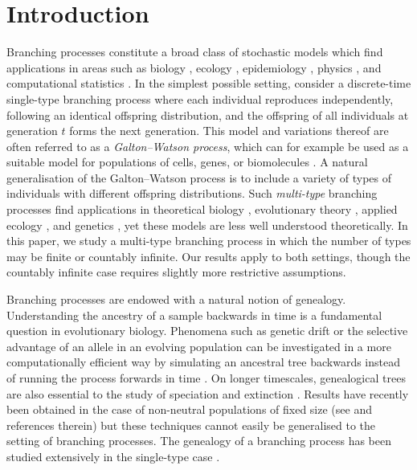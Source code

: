 \documentclass[preprint,3p,12pt]{elsarticle}
\theoremstyle{definition}
\begin{document}
\section{Introduction}
\thispagestyle{empty}
Branching processes constitute a broad class of stochastic models which find applications in areas such as biology \cite{cell_cycle, luria, colon, complexity}, ecology \cite{lambert}, epidemiology \cite{epidemiology}, physics \cite{harris1963}, and computational statistics \cite{multilevel}. 
In the simplest possible setting, consider a discrete-time single-type branching process where each individual reproduces independently, following an identical offspring distribution, and the offspring of all individuals at generation $t$ forms the next generation. This model and variations thereof are often referred to as a \emph{Galton--Watson process}, which can for example be used as a suitable model for populations of cells, genes, or biomolecules \cite{branching_biology}. 
A natural generalisation of the Galton--Watson process is to include a variety of types of individuals with different offspring distributions. Such \emph{multi-type} branching processes find applications in theoretical biology \cite{cell_cycle}, evolutionary theory \cite{colon, complexity}, applied ecology \cite{lambert}, and genetics \cite{luria}, yet these models are less well understood theoretically. In this paper, we study a multi-type branching process in which the number of types may be finite or countably infinite. Our results apply to both settings, though the countably infinite case requires slightly more restrictive assumptions.

Branching processes are endowed with a natural notion of genealogy. Understanding the ancestry of a sample backwards in time is a fundamental question in evolutionary biology. Phenomena such as genetic drift or the selective advantage of an allele in an evolving population can be investigated in a more computationally efficient way by simulating an ancestral tree backwards instead of running the process forwards in time \cite{maddison, Rosenberg2002}. On longer timescales, genealogical trees are also essential to the study of speciation and extinction \cite{coalescent, speciation, popvic}. Results have recently been obtained in the case of non-neutral populations of fixed size (see \cite{koskela2024genealogical} and references therein) but these techniques cannot easily be generalised to the setting of branching processes. The genealogy of a branching process has been studied extensively in the single-type case \cite{lambert, Athreya_2012, athreya_super, harris2020, johnston}. 
\end{document}
